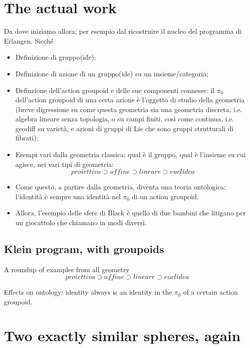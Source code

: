 \documentclass{amsart}
\begin{document}
\section{The actual work}
Da dove iniziamo allora; per esempio dal ricostruire il nucleo del programma di Erlangen. Sicché
	\begin{itemize}
		\item Definizione di gruppo(ide);
		\item Definizione di azione di un gruppo(ide) su un insieme/categoria;
		\item Definzione dell'action groupoid e delle sue componenti connesse: il $\pi_0$ dell'action groupoid di una certa azione è l'oggetto di studio della geometria (breve digressione su come questa geometria sia una geometria discreta, i.e. algebra lineare senza topologia, o su campi finiti, così come continua, i.e. geodiff su varietà, e azioni di gruppi di Lie che sono gruppi strutturali di fibrati);
		\item Esempi vari dalla geometria classica: qual è il gruppo, qual è l'insieme su cui agisce, nei vari tipi di geometria:
		      \[proiettiva \supset affine \supset lineare \supset euclidea\]
		\item Come questo, a partire dalla geometria, diventa una teoria ontologica: l'identità è sempre una identità nel $\pi_0$ di un action groupoid.
		\item Allora, l'esempio delle sfere di Black è quello di due bambini che litigano per un giocattolo che chiamano in modi diversi.
	\end{itemize}
\begin{definition}[Groupoid]

\end{definition}
\begin{definition}[Actegory]

\end{definition}
\begin{definition}

\end{definition}
\begin{definition}

\end{definition}
\subsection{Klein program, with groupoids}
\begin{remark}

\end{remark}
\begin{example}
  A roundup of examples from all geometry
\[proiettiva \supset affine \supset lineare \supset euclidea\]
\end{example}
Effects on ontology: identity always is an identity in the $\pi_0$ of a certain action groupoid.

\section{Two exactly similar spheres, again}
\end{document}
